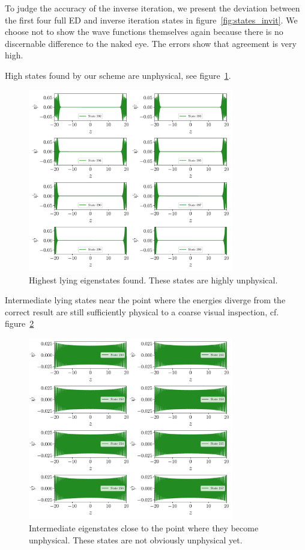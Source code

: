 \documentclass[a4paper,DIV=12,english]{scrartcl}
\begin{document}
To judge the accuracy of the inverse iteration, we present the deviation between the first four full ED and inverse iteration states in figure~\ref{fig:states_invit}. We choose not to show the wave functions themselves again because there is no discernable difference to the naked eye. The errors show that agreement is very high.

High states found by our scheme are unphysical, see figure~\ref{fig:bad_states}.
\begin{figure}
    \centering
    \includegraphics[width=0.8\textwidth]{../plots/states/states_high.pdf}
    \caption{Highest lying eigenstates found. These states are highly unphysical.}
    \label{fig:bad_states}
\end{figure}

Intermediate lying states near the point where the energies diverge from the correct result are still sufficiently physical to a coarse visual inspection, cf. figure~\ref{fig:ok_states}
\begin{figure}
    \centering
    \includegraphics[width=0.8\textwidth]{../plots/states/states_low_middle.pdf}
    \caption{Intermediate eigenstates close to the point where they become unphysical. These states are not obviously unphysical yet.}
    \label{fig:ok_states}
\end{figure}
\end{document}

